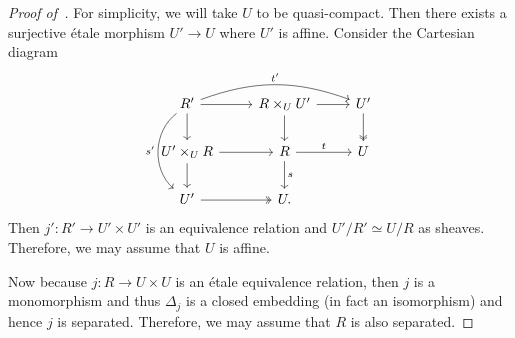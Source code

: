 \documentclass{amsart}
\theoremstyle{definition}
\theoremstyle{remark}
\theoremstyle{plain}
\theoremstyle{definition}
\theoremstyle{remark}
\newcommand{\1}{\mathbf{1}}
\newcommand{\2}{\mathbf{2}}
\newcommand{\3}{\mathbf{3}}
\begin{document}
\begin{proof}[Proof of~]
    For simplicity, we will take \(U\) to be quasi-compact. Then there exists a surjective \'etale morphism \(U' \to U\) where \(U'\) is affine. Consider the Cartesian diagram
    \begin{equation*}
    \begin{tikzcd}
        R' \ar{r} \ar{d} \ar[bend left=20]{rr}{t'} \ar[bend right=50]{dd}[swap]{s'}  & R \times_U U' \ar{r} \ar{d} & U' \ar[twoheadrightarrow]{d} \\
        U' \times_U R \ar{r} \ar{d} & R \ar{r}{t} \ar{d}{s} & U \\
        U' \ar[twoheadrightarrow]{r} & U.
    \end{tikzcd}
    \end{equation*}
    Then \(j' \colon R' \to U' \times U'\) is an equivalence relation and \(U' / R' \simeq U/R\) as sheaves. Therefore, we may assume that \(U\) is affine.

    Now because \(j \colon R \to U \times U\) is an \'etale equivalence relation, then \(j\) is a monomorphism and thus \(\Delta_j\) is a closed embedding (in fact an isomorphism) and hence \(j\) is separated. Therefore, we may assume that \(R\) is also separated.


\end{proof}
\end{document}

